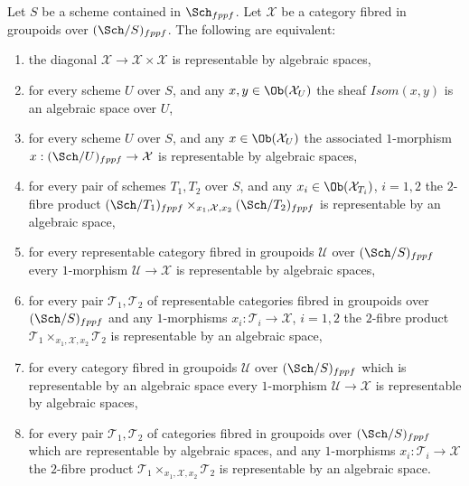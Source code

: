 \begin{lemma}
\label{lemma-representable-diagonal}
Let $S$ be a scheme contained in $\Sch_{fppf}$.
Let $\mathcal{X}$ be a category fibred in groupoids over
$(\Sch/S)_{fppf}$. The following are equivalent:
\begin{enumerate}
\item the diagonal $\mathcal{X} \to \mathcal{X} \times \mathcal{X}$
is representable by algebraic spaces,
\item for every scheme $U$ over $S$, and any
$x, y \in \Ob(\mathcal{X}_U)$ the sheaf
$\mathit{Isom}(x, y)$ is an algebraic space over $U$,
\item for every scheme $U$ over $S$, and any $x \in \Ob(\mathcal{X}_U)$
the associated $1$-morphism $x : (\Sch/U)_{fppf} \to \mathcal{X}$
is representable by algebraic spaces,
\item for every pair of schemes $T_1, T_2$ over $S$, and any
$x_i \in \Ob(\mathcal{X}_{T_i})$, $i = 1, 2$ the $2$-fibre product
$(\Sch/T_1)_{fppf} \times_{x_1, \mathcal{X}, x_2}
(\Sch/T_2)_{fppf}$
is representable by an algebraic space,
\item for every representable category fibred in groupoids $\mathcal{U}$
over $(\Sch/S)_{fppf}$ every $1$-morphism
$\mathcal{U} \to \mathcal{X}$ is representable by algebraic spaces,
\item for every pair $\mathcal{T}_1, \mathcal{T}_2$ of representable
categories fibred in groupoids over $(\Sch/S)_{fppf}$ and any
$1$-morphisms $x_i : \mathcal{T}_i \to \mathcal{X}$, $i = 1, 2$ the
$2$-fibre product $\mathcal{T}_1 \times_{x_1, \mathcal{X}, x_2} \mathcal{T}_2$
is representable by an algebraic space,
\item for every category fibred in groupoids $\mathcal{U}$
over $(\Sch/S)_{fppf}$ which is
representable by an algebraic space every $1$-morphism
$\mathcal{U} \to \mathcal{X}$ is representable by algebraic spaces,
\item for every pair $\mathcal{T}_1, \mathcal{T}_2$ of categories fibred
in groupoids over $(\Sch/S)_{fppf}$ which are representable
by algebraic spaces, and any $1$-morphisms
$x_i : \mathcal{T}_i \to \mathcal{X}$ the
$2$-fibre product $\mathcal{T}_1 \times_{x_1, \mathcal{X}, x_2} \mathcal{T}_2$
is representable by an algebraic space.
\end{enumerate}
\end{lemma}


